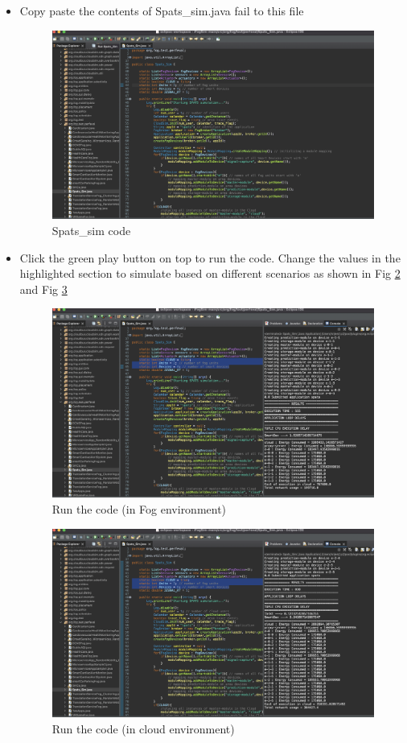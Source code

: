 \documentclass[10pt]{article}
\begin{document}
\begin{itemize}
\item Copy paste the contents of Spats\_sim.java fail to this file 
\begin{figure}[H]
    \begin{center}
        \includegraphics[width=0.7\linewidth, frame]{CA2-template/CM35.png}
       \caption{Spats_sim code \label{fig:25}}
    \end{center}
\end{figure}

\item Click the green play button on top to run the code. Change the values in the highlighted section to simulate based on different scenarios as shown in Fig \ref{fig:26} and Fig \ref{fig:27}
\begin{figure}[H]
    \begin{center}
        \includegraphics[width=0.7\linewidth, frame]{CA2-template/CM36.png}
       \caption{Run the code (in Fog environment) \label{fig:26}}
    \end{center}
\end{figure}

\begin{figure}[H]
    \begin{center}
        \includegraphics[width=0.7\linewidth, frame]{CA2-template/CM37.png}
       \caption{Run the code (in cloud environment) \label{fig:27}}
    \end{center}
\end{figure}
\end{itemize}
\end{document}
